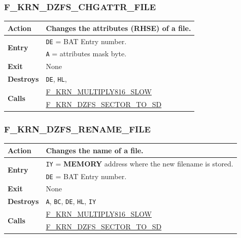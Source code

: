 \documentclass[a4paper,11pt]{article}
\begin{document}
        \subsubsection{F\_KRN\_DZFS\_CHGATTR\_FILE}
        \label{func:fkrndzfschgattrfile}
        \begin{tabular}{l p{9cm}}
            \hline\textbf{Action}
            & Changes the attributes (RHSE) of a file.\\
            \hline\multirow[t]{2}{4em}{\textbf{Entry}}
            & \texttt{DE} = BAT Entry number.\\
            & \texttt{A} = attributes mask byte.\\
            \hline\textbf{Exit} & None\\
            \hline\textbf{Destroys} & \texttt{DE}, \texttt{HL},\\
            \hline\multirow[t]{2}{4em}{\textbf{Calls}}
            & \hyperref[func:fkrnmultiply816slow]{F\_KRN\_MULTIPLY816\_SLOW}\\
            & \hyperref[func:fkrndzfssectortodisk]{F\_KRN\_DZFS\_SECTOR\_TO\_SD}\\
            \hline
        \end{tabular}

        \subsubsection{F\_KRN\_DZFS\_RENAME\_FILE}
        \label{func:fkrndzfsrenamefile}
        \begin{tabular}{l p{9cm}}
            \hline\textbf{Action}
            & Changes the name of a file.\\
            \hline\multirow[t]{2}{4em}{\textbf{Entry}}
            & \texttt{IY} = \textbf{MEMORY} address where the new filename is
            stored.\\
            & \texttt{DE} = BAT Entry number.\\
            \hline\textbf{Exit} & None\\
            \hline\textbf{Destroys} & \texttt{A}, \texttt{BC}, \texttt{DE},
            \texttt{HL}, \texttt{IY}\\
            \hline\multirow[t]{2}{4em}{\textbf{Calls}}
            & \hyperref[func:fkrnmultiply816slow]{F\_KRN\_MULTIPLY816\_SLOW}\\
            & \hyperref[func:fkrndzfssectortodisk]{F\_KRN\_DZFS\_SECTOR\_TO\_SD}\\
            \hline
        \end{tabular}
\end{document}
